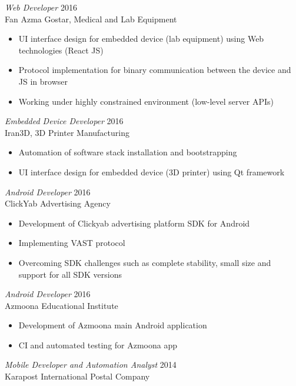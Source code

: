 \documentclass[margin, 10pt]{res} %
\begin{document}
\begin{resume}
{\sl Web Developer} \hfill 2016 \\
Fan Azma Gostar, Medical and Lab Equipment \\

\begin{itemize} \itemsep -2pt %
\item UI interface design for embedded device (lab equipment) using Web
  technologies (React JS)
\item Protocol implementation for binary communication between the device and JS
  in browser
\item Working under highly constrained environment (low-level server APIs)
\end{itemize}

{\sl Embedded Device Developer} \hfill 2016 \\
Iran3D, 3D Printer Manufacturing \\

\begin{itemize} \itemsep -2pt %
\item Automation of software stack installation and bootstrapping 
\item UI interface design for embedded device (3D printer) using Qt framework
\end{itemize}

{\sl Android Developer} \hfill 2016 \\
ClickYab Advertising Agency

\begin{itemize} \itemsep -2pt %
\item Development of Clickyab advertising platform SDK for Android
\item Implementing VAST protocol
\item Overcoming SDK challenges such as complete stability, small size and support
  for all SDK versions
\end{itemize}

{\sl Android Developer} \hfill 2016 \\
Azmoona Educational Institute

\begin{itemize} \itemsep -2pt %
\item Development of Azmoona main Android application
\item CI and automated testing for Azmoona app
\end{itemize}

{\sl Mobile Developer and Automation Analyst} \hfill 2014 \\
Karapost International Postal Company


\end{resume}
\end{document}
